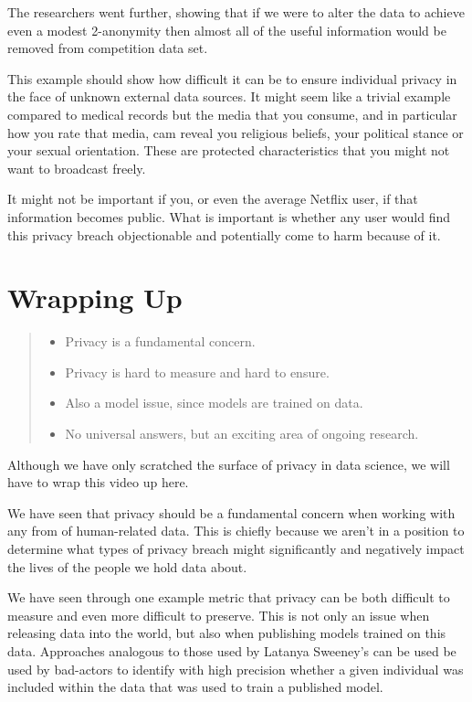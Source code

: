 \documentclass[
  letterpaper,
  DIV=11,
  numbers=noendperiod]{scrreprt}
\providecommand{\tightlist}{%
  \setlength{\itemsep}{0pt}\setlength{\parskip}{0pt}}\usepackage{longtable,booktabs,array}
\begin{document}
The researchers went further, showing that if we were to alter the data
to achieve even a modest 2-anonymity then almost all of the useful
information would be removed from competition data set.

This example should show how difficult it can be to ensure individual
privacy in the face of unknown external data sources. It might seem like
a trivial example compared to medical records but the media that you
consume, and in particular how you rate that media, cam reveal you
religious beliefs, your political stance or your sexual orientation.
These are protected characteristics that you might not want to broadcast
freely.

It might not be important if you, or even the average Netflix user, if
that information becomes public. What is important is whether any user
would find this privacy breach objectionable and potentially come to
harm because of it.

\section{Wrapping Up}\label{wrapping-up-8}

\begin{quote}
\begin{itemize}
\tightlist
\item
  Privacy is a fundamental concern.
\item
  Privacy is hard to measure and hard to ensure.
\item
  Also a model issue, since models are trained on data.
\item
  No universal answers, but an exciting area of ongoing research.
\end{itemize}
\end{quote}

Although we have only scratched the surface of privacy in data science,
we will have to wrap this video up here.

We have seen that privacy should be a fundamental concern when working
with any from of human-related data. This is chiefly because we aren't
in a position to determine what types of privacy breach might
significantly and negatively impact the lives of the people we hold data
about.

We have seen through one example metric that privacy can be both
difficult to measure and even more difficult to preserve. This is not
only an issue when releasing data into the world, but also when
publishing models trained on this data. Approaches analogous to those
used by Latanya Sweeney's can be used be used by bad-actors to identify
with high precision whether a given individual was included within the
data that was used to train a published model.
\end{document}
